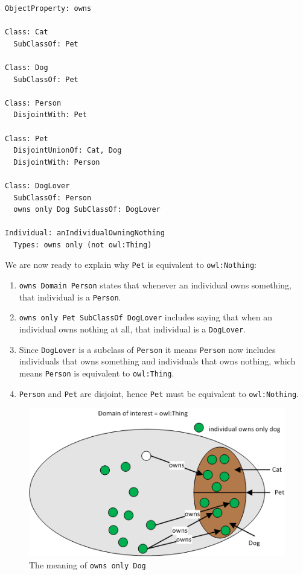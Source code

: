 \documentclass{amsart}
\begin{document}
\begin{small}
\begin{verbatim} 
ObjectProperty: owns
        
Class: Cat
  SubClassOf: Pet
    
Class: Dog
  SubClassOf: Pet
    
Class: Person
  DisjointWith: Pet
        
Class: Pet
  DisjointUnionOf: Cat, Dog
  DisjointWith: Person
  
Class: DogLover
  SubClassOf: Person
  owns only Dog SubClassOf: DogLover
  
Individual: anIndividualOwningNothing
  Types: owns only (not owl:Thing)
\end{verbatim}
\end{small} 

We are now ready to explain why \texttt{Pet} is equivalent to \texttt{owl:Nothing}:
\begin{enumerate}
 \item \texttt{owns Domain Person} states that whenever an individual owns something, that individual is a \texttt{Person}. 
 \item \texttt{owns only Pet SubClassOf DogLover} includes saying that when an individual owns nothing at all, that individual is a \texttt{DogLover}.
 \item Since \texttt{DogLover} is a subclass of \texttt{Person} it means \texttt{Person} now includes individuals that owns something and individuals that owns nothing, which means \texttt{Person} is equivalent to \texttt{owl:Thing}.
 \item \texttt{Person} and \texttt{Pet} are disjoint, hence \texttt{Pet} must be equivalent to \texttt{owl:Nothing}.
\end{enumerate}

    \begin{figure}
      \centering \includegraphics[trim = 0mm 0mm 0mm 0mm, clip, scale=1]{./OwnsOnlyDog.png}
      \caption{The meaning of \texttt{owns only Dog}}\label{fig_OwnsOnlyDog}
    \end{figure}
\end{document}
